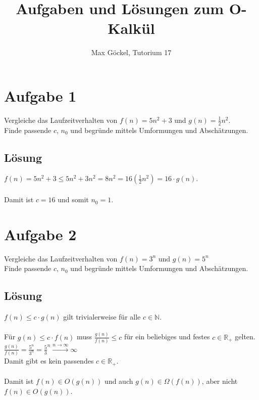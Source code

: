 \documentclass[11pt]{article} %
\title{Aufgaben und Lösungen zum O-Kalkül}
\author{Max Göckel, Tutorium 17}
\date{} %
\begin{document}
\maketitle


\section{Aufgabe 1}

Vergleiche das Laufzeitverhalten von $f(n) = 5n^2 + 3$ und $g(n) = \frac{1}{2} n^2$.\\
Finde passende $c$, $n_0$ und begründe mittels Umformungen und Abschätzungen.

\subsection{Lösung}

$f(n) = 5n^2 + 3 \leq 5n^2 + 3n^2 = 8n^2 = 16(\frac{1}{2} n^2) = 16 \cdot g(n)$.\\
\ \\
Damit ist $c = 16$ und somit $n_0 = 1$.


\section{Aufgabe 2}

Vergleiche das Laufzeitverhalten von $f(n) = 3^n$ und $g(n) = 5^n$\\
Finde passende $c$, $n_0$ und begründe mittels Umformungen und Abschätzungen.


\subsection{Lösung}

$f(n) \leq c \cdot g(n)$ gilt trivialerweise für alle $c \in \mathbb{N}$.\\
\ \\
Für $g(n) \leq  c \cdot f(n)$ muss $\frac{ g(n) }{ f(n) } \leq c$ für ein beliebiges und festes $c \in \mathbb{R}_+$ gelten.\\

$\frac{ g(n) }{ f(n) } = \frac{ 5^n }{ 3^n } = \frac{5}{3}^n \xrightarrow{\text{$n \rightarrow \infty$}} \infty $\\
Damit gibt es kein passendes $c \in \mathbb{R}_+$.\\
\ \\
Damit ist $f(n) \in O( g(n) )$ und auch $g(n) \in \Omega( f(n) )$, aber nicht $f(n) \in O( g(n) )$.
\end{document}
